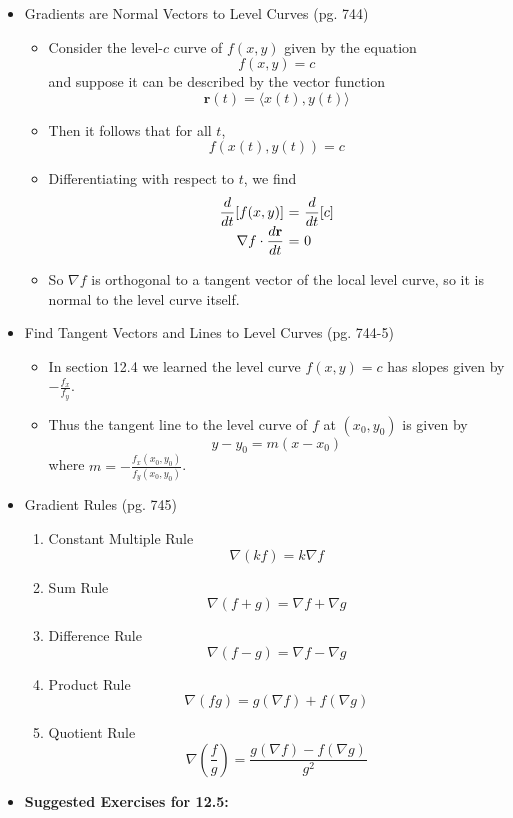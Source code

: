 \documentclass[12pt]{article}
\theoremstyle{plain}
\theoremstyle{definition}
\theoremstyle{remark}
\newcommand{\ds}{\displaystyle}
\newcommand{\vect}[1]{\mathbf{#1}}
\begin{document}
\begin{itemize}
	\item Gradients are Normal Vectors to Level Curves (pg. 744)
		\begin{itemize}
		\item Consider the level-$c$ curve of $f(x,y)$ given by the equation \[f(x,y)=c\] and suppose it can be described by the vector function \[\vect{r}(t) = \langle x(t),y(t) \rangle\]
		\item Then it follows that for all $t$, \[f(x(t),y(t))=c\]
		\item Differentiating with respect to $t$, we find
	\[
	\begin{array}{r@{\ =\ }l}\ds
	\frac{d}{dt}[f(x,y)]
	&\ds
	\frac{d}{dt}[c]
	\\\ds
	\nabla f \cdot \frac{d\vect{r}}{dt}
	&\ds
	0
	\end{array}
	\]
		\item So $\nabla f$ is orthogonal to a tangent vector of the local level curve, so it is normal to the level curve itself.
		\end{itemize}
	
	\item Find Tangent Vectors and Lines to Level Curves (pg. 744-5)
		\begin{itemize}
	
		\item In section 12.4 we learned the level curve $f(x,y)=c$ has slopes given by $-\frac{f_x}{f_y}$.
		\item Thus the tangent line to the level curve of $f$ at $(x_0,y_0)$ is given by \[y-y_0=m(x-x_0)\] where $m = -\frac{f_x(x_0,y_0)}{f_y(x_0,y_0)}$.
		\end{itemize}
	\newpage
	\item Gradient Rules (pg. 745)
	
			\begin{enumerate}
			\item Constant Multiple Rule
			\[\nabla(kf)=k\nabla f\]
			\item Sum Rule
			\[\nabla(f+g)=\nabla f+\nabla g\]
			\item Difference Rule
			\[\nabla(f-g)=\nabla f-\nabla g\]
			\item Product Rule
			\[\nabla(fg)=g(\nabla f)+f(\nabla g)\]
			\item Quotient Rule
			\[\nabla\left(\frac{f}{g}\right)=\frac{g(\nabla f)-f(\nabla g)}{g^2}\]
			\end{enumerate}
	
	\item \textbf{Suggested Exercises for 12.5:}
	

\end{itemize}
\end{document}
